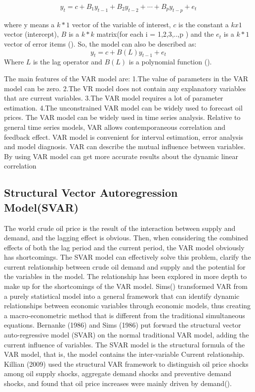 \[y_{t}=c+B_{1} y_{t-1}+B_{2} y_{t-2}+\cdots+B_{p} y_{t-p}+e_{t}\] 

where y means a $k*1$ vector of the variable of interest, $c$ is the constant a $kx1$ vector (intercept), $B$ is a $k*k$ matrix(for each i = 1,2,3,..,p ) and the $e_{t}$ is a $k*1$ vector of error items (\cite{huntington2013oil}). So, the model can also be described as: 
\[y_{t}=c+B(L) y_{t-1}+e_{t}\]
Where $L$ is the lag operator and $B(L)$ is a polynomial function (\cite{huntington2013oil}). 

The main features of the VAR model are: 1.The value of parameters in the VAR model can be zero. 2.The VR model does not contain any explanatory variables that are current variables. 3.The VAR model requires a lot of parameter estimation. 4.The unconstrained VAR model can be widely used to forecast oil prices.
The VAR model can be widely used in time series analysis. Relative to general time series models, VAR allows contemporaneous correlation and feedback effect. VAR model is convenient for interval estimation, error analysis and model diagnosis. VAR can describe the mutual influence between variables. By using VAR model can get more accurate results about the dynamic linear correlation

\subsection{Structural Vector Autoregression Model(SVAR)}
The world crude oil price is the result of the interaction between supply and demand, and the lagging effect is obvious. Then, when considering the combined effects of both the lag period and the current period, the VAR model obviously has shortcomings. The SVAR model can effectively solve this problem, clarify the current relationship between crude oil demand and supply and the potential for the variables in the model. The relationship has been explored in more depth to make up for the shortcomings of the VAR model. Sims(\cite{}) transformed VAR from a purely statistical model into a general framework that can identify dynamic relationships between economic variables through economic models, thus creating a macro-econometric method that is different from the traditional simultaneous equations. Bernanke (1986) and Sims (1986) put forward the structural vector auto-regressive model (SVAR) on the normal traditional VAR model, adding the current influence of variables. The SVAR model is the structural formula of the VAR model, that is, the model contains the inter-variable  Current relationship. Killian (2009) used the structural VAR framework to distinguish oil price shocks among oil supply shocks, aggregate demand shocks and preventive demand shocks, and found that oil price increases were mainly driven by demand(\cite{kilian2009not}).


